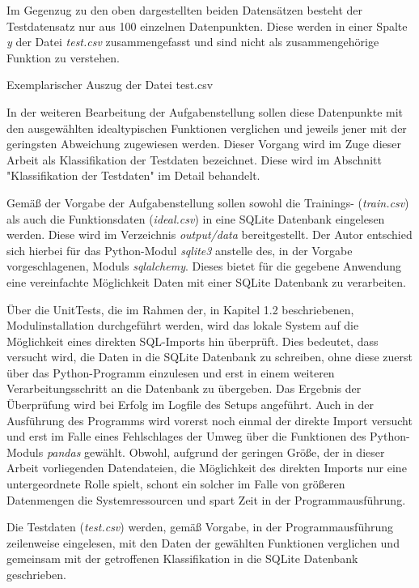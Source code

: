 Im Gegenzug zu den oben dargestellten beiden Datensätzen besteht der Testdatensatz nur aus 100 einzelnen Datenpunkten. Diese werden in einer Spalte \emph{y} der Datei \emph{test.csv} zusammengefasst und sind nicht als zusammengehörige Funktion zu verstehen. 

\begin{table}[H]
\small
\centering
{}
\caption{Exemplarischer Auszug der Datei test.csv}
\label{tab:test.csv}
\end{table} 

In der weiteren Bearbeitung der Aufgabenstellung sollen diese Datenpunkte mit den ausgewählten idealtypischen Funktionen verglichen und jeweils jener mit der geringsten Abweichung zugewiesen werden. Dieser Vorgang wird im Zuge dieser Arbeit als Klassifikation der Testdaten bezeichnet. Diese wird im Abschnitt "Klassifikation der Testdaten" im Detail behandelt.

Gemäß der Vorgabe der Aufgabenstellung sollen sowohl die Trainings- (\emph{train.csv}) als auch die Funktionsdaten (\emph{ideal.csv}) in eine SQLite Datenbank eingelesen werden. Diese wird im Verzeichnis \emph{output/data} bereitgestellt. Der Autor entschied sich hierbei für das Python-Modul \emph{sqlite3} anstelle des, in der Vorgabe vorgeschlagenen, Moduls \emph{sqlalchemy}. Dieses bietet für die gegebene Anwendung eine vereinfachte Möglichkeit Daten mit einer SQLite Datenbank zu verarbeiten.

Über die UnitTests, die im Rahmen der, in Kapitel 1.2 beschriebenen, Modulinstallation durchgeführt werden, wird das lokale System auf die Möglichkeit eines direkten SQL-Imports hin überprüft. Dies bedeutet, dass versucht wird, die Daten in die SQLite Datenbank zu schreiben, ohne diese zuerst über das Python-Programm einzulesen und erst in einem weiteren Verarbeitungsschritt an die Datenbank zu übergeben. Das Ergebnis der Überprüfung wird bei Erfolg im Logfile des Setups angeführt. Auch in der Ausführung des Programms wird vorerst noch einmal der direkte Import versucht und erst im Falle eines Fehlschlages der Umweg über die Funktionen des Python-Moduls \emph{pandas} gewählt. Obwohl, aufgrund der geringen Größe, der in dieser Arbeit vorliegenden Datendateien, die Möglichkeit des direkten Imports nur eine untergeordnete Rolle spielt, schont ein solcher im Falle von größeren Datenmengen die Systemressourcen und spart Zeit in der Programmausführung.

Die Testdaten (\emph{test.csv}) werden, gemäß Vorgabe, in der Programmausführung zeilenweise eingelesen, mit den Daten der gewählten Funktionen verglichen und gemeinsam mit der getroffenen Klassifikation in die SQLite Datenbank geschrieben.

